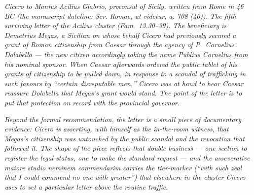 
\textit{Cicero to Manius Acilius Glabrio, proconsul of
Sicily, written from Rome in 46 BC (the manuscript
dateline: \textit{Scr. Romae, ut videtur, a. 708 (46)}).
The fifth surviving letter of the Acilius cluster (Fam.\
13.30--39). The beneficiary is Demetrius Megas, a
Sicilian on whose behalf Cicero had previously secured a
grant of Roman citizenship from Caesar through the
agency of P.\ Cornelius Dolabella --- the new citizen
accordingly taking the name Publius Cornelius from his
nominal sponsor. When Caesar afterwards ordered the
public tablet of his grants of citizenship to be pulled
down, in response to a scandal of trafficking in such
favours by ``certain disreputable men,'' Cicero was at
hand to hear Caesar reassure Dolabella that Megas's
grant would stand. The point of the letter is to put
that protection on record with the provincial
governor.}

\textit{Beyond the formal recommendation, the letter is
a small piece of documentary evidence: Cicero is
asserting, with himself as the in-the-room witness, that
Megas's citizenship was untouched by the public scandal
and the revocation that followed it. The shape of the
piece reflects that double business --- one section to
register the legal status, one to make the standard
request --- and the asseverative \textit{maiore studio
neminem commendarim} carries the tier-marker (``with
such zeal that I could commend no one with greater'')
that elsewhere in the cluster Cicero uses to set a
particular letter above the routine traffic.}
